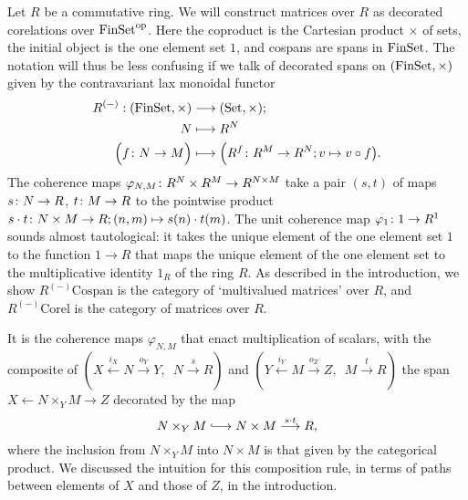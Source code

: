 Let $R$ be a commutative ring. We will construct matrices over $R$ as decorated
corelations over $\mathrm{FinSet}^{\mathrm{op}}$. Here the coproduct is the Cartesian product
$\times$ of sets, the initial object is the one element set $1$, and cospans are
spans in $\mathrm{FinSet}$. The notation will thus be less confusing if we talk of
decorated spans on $(\mathrm{FinSet},\times)$ given by the contravariant lax monoidal
functor
\begin{align*}
  R^{(-)}: (\mathrm{FinSet},\times) &\longrightarrow (\mathrm{Set},\times); \\
  N &\longmapsto R^N \\
  \Big(f{\colon} N \to M\Big) &\longmapsto \Big(R^f{\colon} R^M \to R^N; v \mapsto v \circ
  f\big).
\end{align*}
The coherence maps $\varphi_{N,M}{\colon} R^N \times R^M \to R^{N\times M}$ take a
pair $(s,t)$ of maps $s{\colon} N \to R$, $t{\colon} M \to R$ to the pointwise product
$s\cdot t {\colon} N\times M \to R; (n,m) \mapsto s(n) \cdot t(m)$. The unit
coherence map $\varphi_1{\colon} 1 \to R^1$ sounds almost tautological: it takes
the unique element of the one element set $1$ to the function $1 \to R$ that
maps the unique element of the one element set to the multiplicative identity
$1_R$ of the ring $R$.  As described in the introduction, we show
$R^{(-)}\mathrm{Cospan}$ is the category of `multivalued matrices' over $R$, and
$R^{(-)}\mathrm{Corel}$ is the category of matrices over $R$. 

It is the coherence maps $\varphi_{N,M}$ that enact multiplication of scalars,
with the composite of $(X \xleftarrow{i_X} N \xrightarrow{o_Y} Y,\enspace N
\xrightarrow{s} R)$ and $(Y \xleftarrow{i_Y} M \xrightarrow{o_Z} Z,\enspace M
\xrightarrow{t} R)$ the span $X \leftarrow N\times_YM \rightarrow Z$ decorated
by the map
\[
  N \times_YM \hooklongrightarrow N \times M \stackrel{s \cdot t}\longrightarrow
  R,
\]
where the inclusion from $N \times_YM$ into $N \times M$ is that given by the
categorical product. We discussed the intuition for this composition rule, in
terms of paths between elements of $X$ and those of $Z$, in the introduction. 

